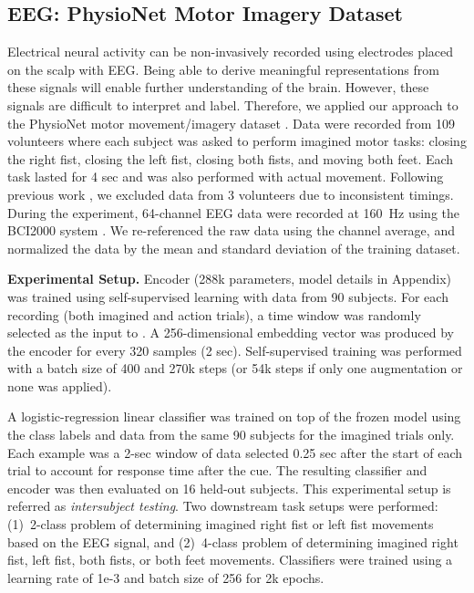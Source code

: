 \documentclass{article}
\renewcommand{\paragraph}[1]{\textbf{#1}\hspace{1em}}
\begin{document}
\subsection{EEG: PhysioNet Motor Imagery Dataset}

Electrical neural activity can be non-invasively recorded using electrodes
placed on the scalp with EEG. Being able to derive meaningful representations
from these signals will enable further understanding of the brain. However,
these signals are difficult to interpret and label. Therefore, we applied our
approach to the PhysioNet motor movement/imagery dataset
\cite{goldberger_physiobank_2000,schalk_bci2000_2004,physionet_eeg_url}. Data
were recorded from 109 volunteers where each subject was asked to perform
imagined motor tasks: closing the right fist, closing the left fist, closing
both fists, and moving both feet. Each task lasted for 4 sec and was also
performed with actual movement. Following previous work \cite{kim_motor_2016},
we excluded data from 3 volunteers due to inconsistent timings. During the
experiment, 64-channel EEG data were recorded at 160~Hz using the BCI2000 system
\cite{schalk_bci2000_2004}. We re-referenced the raw data using the channel
average, and normalized the data by the mean and standard deviation of the
training dataset.

\paragraph{Experimental Setup.} Encoder  (288k parameters, model details in
Appendix) was trained using self-supervised learning with data from 90 subjects.
For each recording (both imagined and action trials), a time window was randomly
selected as the input to . A 256-dimensional embedding vector was produced by
the encoder for every 320 samples (2 sec). Self-supervised training was
performed with a batch size of 400 and 270k steps (or 54k steps if only one
augmentation or none was applied).

A logistic-regression linear classifier was trained on top of the frozen 
model using the class labels and data from the same 90 subjects for the imagined
trials only. Each example was a 2-sec window of data selected 0.25 sec after the
start of each trial to account for response time after the cue. The resulting
classifier and encoder  was then evaluated on 16 held-out subjects. This
experimental setup is referred as \textit{intersubject testing}. Two downstream
task setups were performed: (1)~2-class problem of determining imagined right
fist or left fist movements based on the EEG signal, and (2)~4-class problem of
determining imagined right fist, left fist, both fists, or both feet movements.
Classifiers were trained using a learning rate of 1e-3 and batch size of 256 for
2k epochs.
\end{document}
